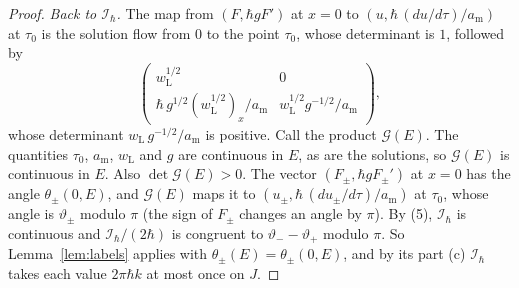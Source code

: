 \documentclass[aps,prd,onecolumn,tightenlines,nofootinbib,notitlepage,11pt,floatfix]{revtex4-2}
\theoremstyle{indentedtheorem}
\begin{document}
\begin{proof}
\emph{Back to $\mathcal{I}_\hbar$.} The map from $(F,\hbar gF')$ at $x=0$ to $(u,\hbar\,(du/d\tau)/a_\text{m})$ at $\tau_0$ is the solution flow from $0$ to the point $\tau_0$, whose determinant is $1$, followed by
\begin{equation*}
    \begin{pmatrix}w_\text{L}^{1/2}&0\\ \hbar\,g^{1/2}(w_\text{L}^{1/2})_x/a_\text{m} & w_\text{L}^{1/2}g^{-1/2}/a_\text{m}\end{pmatrix} ,
\end{equation*}
whose determinant $w_\text{L}\,g^{-1/2}/a_\text{m}$ is positive. Call the product $\mathcal{G}(E)$. The quantities $\tau_0$, $a_\text{m}$, $w_\text{L}$ and $g$ are continuous in $E$, as are the solutions, so $\mathcal{G}(E)$ is continuous in $E$. Also $\det\mathcal{G}(E)>0$. The vector $(F_\pm,\hbar gF_\pm')$ at $x=0$ has the angle $\theta_\pm(0,E)$, and $\mathcal{G}(E)$ maps it to $(u_\pm,\hbar\,(du_\pm/d\tau)/a_\text{m})$ at $\tau_0$, whose angle is $\vartheta_\pm$ modulo $\pi$ (the sign of $F_\pm$ changes an angle by $\pi$). By (5), $\mathcal{I}_\hbar$ is continuous and $\mathcal{I}_\hbar/(2\hbar)$ is congruent to $\vartheta_--\vartheta_+$ modulo $\pi$. So Lemma~\ref{lem:labels} applies with $\theta_\pm(E)=\theta_\pm(0,E)$, and by its part (c) $\mathcal{I}_\hbar$ takes each value $2\pi\hbar k$ at most once on $J$.
\end{proof}
\end{document}
